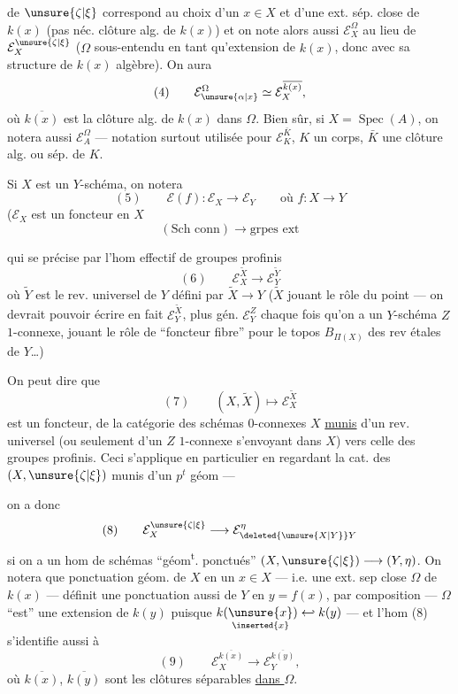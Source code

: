 de $\unsure{\zeta|\xi}$ correspond au choix d'un $x\in X$ et d'une ext. sép. close  \inserted{$\Omega$} de $k(x)$ (pas néc.  clôture alg. de $k(x)$) et on note alors aussi $\mathcal E_X^\Omega$ au lieu de $\mathcal E_X^{\unsure{\zeta|\xi}}$ ($\Omega$ sous-entendu en tant qu'extension de $k(x)$, donc avec sa structure de $k(x)$ algèbre). On aura 
\[
(4)\qquad \mathcal E_{\unsure{\alpha|x}}^\Omega\simeq\mathcal E_X^{\overline{k(x)}},
\]
où $\overline{k(x)}$ est la clôture alg. de $k(x)$ dans $\Omega$. Bien sûr, si $X=\operatorname{Spec}(A)$, on notera aussi $\mathcal E_A^\Omega$ --- notation surtout utilisée pour $\mathcal E_K^{\bar K}$, $K$ un corps, $\bar K$ une clôture alg. ou sép. de $K$.

Si $X$ est un $Y$-schéma,  on notera
\[
(5)\qquad \mathcal E(f):\mathcal E_X\longrightarrow\mathcal E_Y\qquad\text{où }f:X\longrightarrow Y
\]
($\mathcal E_X$ est un foncteur en $X$
\[
(\text{Sch conn})\longrightarrow\text{grpes ext}
\]


qui se précise par l'hom effectif de groupes profinis
\[
(6)\qquad \mathcal E_X^{\widetilde X}\longrightarrow\mathcal E_Y^{\widetilde Y}
\]
où $\widetilde Y$ est le rev. universel de $Y$ défini par $\widetilde X\longrightarrow Y$ ($\widetilde X$ jouant le rôle du point --- on devrait pouvoir écrire en fait $\mathcal E_Y^{\widetilde X}$, plus gén. $\mathcal E_Y^Z$ chaque fois qu'on a un $Y$-schéma $Z$ $1$-connexe, jouant le rôle de ``foncteur fibre'' pour le topos $B_{\Pi(X)}$ des rev étales de $Y$\ldots)


On peut dire que
\[
(7)\qquad (X,\widetilde X)\longmapsto\mathcal E_X^{\widetilde X}
\]
est un foncteur, de la catégorie des schémas $0$-connexes $X$ \uline{munis} d'un rev. universel (ou seulement d'un $Z$ $1$-connexe s'envoyant dans $X$) vers celle des groupes profinis. Ceci s'applique en particulier en regardant la cat. des $(X,\unsure{\zeta|\xi})$ munis d'un $p^t$ géom ---



on a donc
\[
(8)\qquad \mathcal E_X^{\unsure{\zeta|\xi}}\longrightarrow\mathcal E_{\deleted{\unsure{X|Y}}Y}^\eta
\]
si on a un hom de schémas ``géom\textsuperscript{t}.
ponctués'' $(X,\unsure{\zeta|\xi})\longrightarrow(Y,\eta)$. On
notera que  ponctuation géom.
de $X$ en un $x\in X$ --- i.e. une
ext. sep close $\Omega$ de $k(x)$ ---
définit  une ponctuation  aussi 
de $Y$ en $y=f(x)$,  par composition
--- $\Omega$ ``est'' une extension de $k(y)$ puisque
$k(\underset{\inserted{x}}{\unsure{x}})\hookleftarrow k(y)$ --- et l'hom (8)
s'identifie aussi à
\[
(9)\qquad \mathcal E_X^{\overline{k(x)}}\longrightarrow\mathcal E_Y^{\overline{k(y)}},
\]
où $\overline{k(x)}$, $\overline{k(y)}$ sont les clôtures séparables
\uline{dans $\Omega$}.

